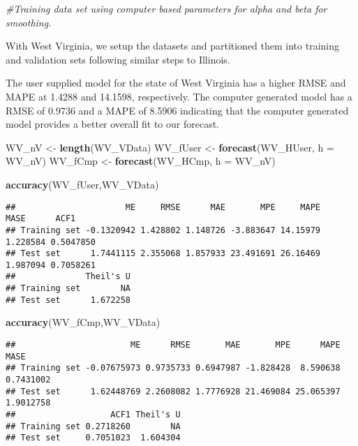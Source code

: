\documentclass[
]{article}
\newenvironment{Shaded}{\begin{snugshade}}{\end{snugshade}}
\newcommand{\CommentTok}[1]{\textcolor[rgb]{0.56,0.35,0.01}{\textit{#1}}}
\newcommand{\DataTypeTok}[1]{\textcolor[rgb]{0.13,0.29,0.53}{#1}}
\newcommand{\KeywordTok}[1]{\textcolor[rgb]{0.13,0.29,0.53}{\textbf{#1}}}
\newcommand{\NormalTok}[1]{#1}
\newcommand{\StringTok}[1]{\textcolor[rgb]{0.31,0.60,0.02}{#1}}
\begin{document}
\begin{Shaded}
\begin{Highlighting}[]
\CommentTok{#Training data set using computer based parameters for alpha and beta for smoothing.}
\end{Highlighting}
\end{Shaded}

With West Virginia, we setup the datasets and partitioned them into
training and validation sets following similar steps to Illinois.

The user supplied model for the state of West Virginia has a higher RMSE
and MAPE at 1.4288 and 14.1598, respectively. The computer generated
model has a RMSE of 0.9736 and a MAPE of 8.5906 indicating that the
computer generated model provides a better overall fit to our forecast.

\begin{Shaded}
\begin{Highlighting}[]
\NormalTok{WV_nV <-}\StringTok{ }\KeywordTok{length}\NormalTok{(WV_VData)}
\NormalTok{WV_fUser <-}\StringTok{ }\KeywordTok{forecast}\NormalTok{(WV_HUser, }\DataTypeTok{h =}\NormalTok{ WV_nV)}
\NormalTok{WV_fCmp <-}\StringTok{ }\KeywordTok{forecast}\NormalTok{(WV_HCmp, }\DataTypeTok{h =}\NormalTok{ WV_nV)}
\end{Highlighting}
\end{Shaded}

\begin{Shaded}
\begin{Highlighting}[]
\KeywordTok{accuracy}\NormalTok{(WV_fUser,WV_VData)}
\end{Highlighting}
\end{Shaded}

\begin{verbatim}
##                      ME     RMSE      MAE       MPE     MAPE     MASE      ACF1
## Training set -0.1320942 1.428802 1.148726 -3.883647 14.15979 1.228584 0.5047850
## Test set      1.7441115 2.355068 1.857933 23.491691 26.16469 1.987094 0.7058261
##              Theil's U
## Training set        NA
## Test set      1.672258
\end{verbatim}

\begin{Shaded}
\begin{Highlighting}[]
\KeywordTok{accuracy}\NormalTok{(WV_fCmp,WV_VData)}
\end{Highlighting}
\end{Shaded}

\begin{verbatim}
##                       ME      RMSE       MAE       MPE      MAPE      MASE
## Training set -0.07675973 0.9735733 0.6947987 -1.828428  8.590638 0.7431002
## Test set      1.62448769 2.2608082 1.7776928 21.469084 25.065397 1.9012758
##                   ACF1 Theil's U
## Training set 0.2718260        NA
## Test set     0.7051023  1.604304
\end{verbatim}
\end{document}
